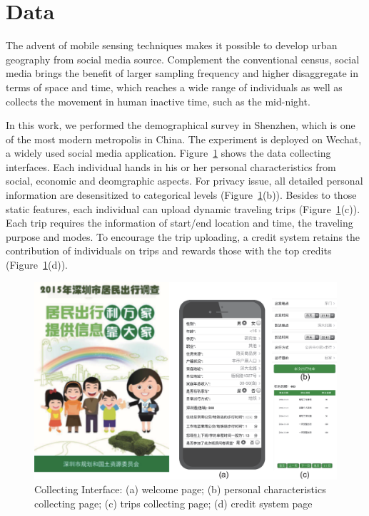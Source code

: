 \section{Data}

The advent of mobile sensing techniques makes it possible to develop urban geography from social media source. Complement the conventional census, social media brings the benefit of larger sampling frequency and higher disaggregate in terms of space and time, which reaches a wide range of individuals as well as collects the movement in human inactive time, such as the mid-night.

In this work, we performed the demographical survey in Shenzhen, which is one of the most modern metropolis in China. The experiment is deployed on Wechat, a widely used social media application. Figure~\ref{fig:app} shows the data collecting interfaces. Each individual hands in his or her personal characteristics from social, economic and deomgraphic aspects. For privacy issue, all detailed personal information are desensitized to categorical levels (Figure~\ref{fig:app}(b)). Besides to those static features, each individual can upload dynamic traveling trips (Figure~\ref{fig:app}(c)). Each trip requires the information of start/end location and time, the traveling purpose and modes. To encourage the trip uploading, a credit system retains the contribution of individuals on trips and rewards those with the top credits (Figure~\ref{fig:app}(d)). 

\begin{figure}[htb!]
 \centering %
 \includegraphics[width=\columnwidth]{pictures/survey_app}
 \caption{Collecting Interface: (a) welcome page; (b) personal characteristics collecting page; (c) trips collecting page; (d) credit system page}
 \label{fig:app}
\end{figure}


